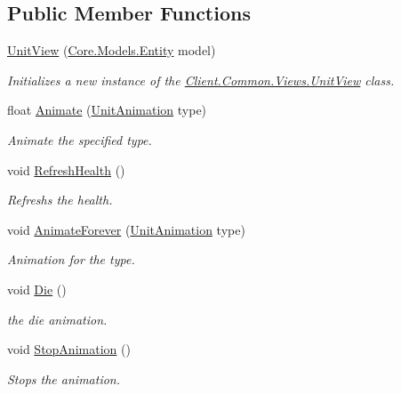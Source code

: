 \subsection*{Public Member Functions}
\begin{DoxyCompactItemize}
\item 
\hyperlink{classClient_1_1Common_1_1Views_1_1UnitView_a6db43232d8801e7eeda8c97a52dd3df8}{Unit\+View} (\hyperlink{classCore_1_1Models_1_1Entity}{Core.\+Models.\+Entity} model)
\begin{DoxyCompactList}\small\item\em Initializes a new instance of the \hyperlink{classClient_1_1Common_1_1Views_1_1UnitView}{Client.\+Common.\+Views.\+Unit\+View} class. \end{DoxyCompactList}\item 
float \hyperlink{classClient_1_1Common_1_1Views_1_1UnitView_a77f75b6239019fdd00dacb2695c59feb}{Animate} (\hyperlink{namespaceClient_1_1Common_1_1Views_a6974b9f5798be7fa135e7517fa41ffe0}{Unit\+Animation} type)
\begin{DoxyCompactList}\small\item\em Animate the specified type. \end{DoxyCompactList}\item 
void \hyperlink{classClient_1_1Common_1_1Views_1_1UnitView_a250edac473dbbc3669531d333eb66858}{Refresh\+Health} ()
\begin{DoxyCompactList}\small\item\em Refreshs the health. \end{DoxyCompactList}\item 
void \hyperlink{classClient_1_1Common_1_1Views_1_1UnitView_a16a10866cdd290c6e5765a696092e1b8}{Animate\+Forever} (\hyperlink{namespaceClient_1_1Common_1_1Views_a6974b9f5798be7fa135e7517fa41ffe0}{Unit\+Animation} type)
\begin{DoxyCompactList}\small\item\em Animation for the type. \end{DoxyCompactList}\item 
void \hyperlink{classClient_1_1Common_1_1Views_1_1UnitView_a0d16300fe5474478fb3eafa9fdce734f}{Die} ()
\begin{DoxyCompactList}\small\item\em the die animation. \end{DoxyCompactList}\item 
void \hyperlink{classClient_1_1Common_1_1Views_1_1UnitView_a1fdff9c291ba177c085ddb5d2b168071}{Stop\+Animation} ()
\begin{DoxyCompactList}\small\item\em Stops the animation. \end{DoxyCompactList}\end{DoxyCompactItemize}
